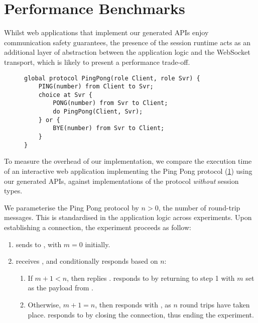 \section{Performance Benchmarks}

Whilst web applications that implement our generated APIs enjoy
communication safety guarantees, the presence of the session runtime acts
as an additional layer of abstraction between the application logic and the
WebSocket transport, which is likely to present a performance trade-off.

\begin{figure}[!ht]
\begin{lstlisting}[language=Scribble]
global protocol PingPong(role Client, role Svr) {
	PING(number) from Client to Svr;
	choice at Svr {
		PONG(number) from Svr to Client;
		do PingPong(Client, Svr);
	} or {
		BYE(number) from Svr to Client;	
	}
}
\end{lstlisting}
\label{lst:pingpong}
\end{figure}

To measure the overhead of our implementation, we compare the
execution time of an interactive web application implementing the
Ping Pong protocol (\cref{lst:pingpong}) using our generated APIs,
against implementations of the protocol \textit{without} session types.

We parameterise the Ping Pong protocol by $n > 0$, the number of
round-trip messages. This is standardised in the application logic
across experiments.
Upon establishing a connection, the experiment proceeds as follow:

\begin{enumerate}

\item {} sends  to , 
with $m = 0$ initially.

\item {} receives , and
conditionally responds based on $n$:

\begin{enumerate}
\item If $m + 1 < n$, then  replies .
 responds to  by returning to
step 1 with $m$ set as the payload from .

\item Otherwise, $m + 1 = n$, then  responds with 
, as $n$ round trips have taken place. 
 responds to  by 
closing the connection, thus ending the experiment.
\end{enumerate}

\end{enumerate}

